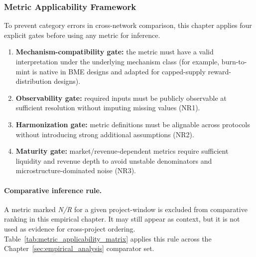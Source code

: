 \subsubsection{Metric Applicability Framework}
\label{subsec:metric_applicability_framework}
To prevent category errors in cross-network comparison, this chapter applies four explicit gates before using any metric for inference.
\begin{enumerate}
    \item \textbf{Mechanism-compatibility gate:} the metric must have a valid interpretation under the underlying mechanism class (for example, burn-to-mint is native in BME designs and adapted for capped-supply reward-distribution designs).
    \item \textbf{Observability gate:} required inputs must be publicly observable at sufficient resolution without imputing missing values (NR1).
    \item \textbf{Harmonization gate:} metric definitions must be alignable across protocols without introducing strong additional assumptions (NR2).
    \item \textbf{Maturity gate:} market/revenue-dependent metrics require sufficient liquidity and revenue depth to avoid unstable denominators and microstructure-dominated noise (NR3).
\end{enumerate}

\paragraph{Comparative inference rule.}
A metric marked \emph{N/R} for a given project-window is excluded from comparative ranking in this empirical chapter. It may still appear as context, but it is not used as evidence for cross-project ordering.
Table~\ref{tab:metric_applicability_matrix} applies this rule across the Chapter~\ref{sec:empirical_analysis} comparator set.

